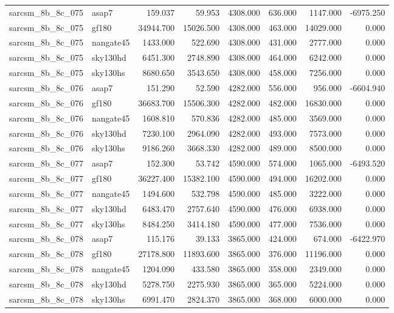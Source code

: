 \begin{tabular}{llrrrrrr}
sarcsm\_8b\_8c\_075 & asap7 & 159.037 & 59.953 & 4308.000 & 636.000 & 1147.000 & -6975.250 \\
sarcsm\_8b\_8c\_075 & gf180 & 34944.700 & 15026.500 & 4308.000 & 463.000 & 14029.000 & 0.000 \\
sarcsm\_8b\_8c\_075 & nangate45 & 1433.000 & 522.690 & 4308.000 & 431.000 & 2777.000 & 0.000 \\
sarcsm\_8b\_8c\_075 & sky130hd & 6451.300 & 2748.890 & 4308.000 & 464.000 & 6242.000 & 0.000 \\
sarcsm\_8b\_8c\_075 & sky130hs & 8680.650 & 3543.650 & 4308.000 & 458.000 & 7256.000 & 0.000 \\
sarcsm\_8b\_8c\_076 & asap7 & 151.290 & 52.590 & 4282.000 & 556.000 & 956.000 & -6604.940 \\
sarcsm\_8b\_8c\_076 & gf180 & 36683.700 & 15506.300 & 4282.000 & 482.000 & 16830.000 & 0.000 \\
sarcsm\_8b\_8c\_076 & nangate45 & 1608.810 & 570.836 & 4282.000 & 485.000 & 3569.000 & 0.000 \\
sarcsm\_8b\_8c\_076 & sky130hd & 7230.100 & 2964.090 & 4282.000 & 493.000 & 7573.000 & 0.000 \\
sarcsm\_8b\_8c\_076 & sky130hs & 9186.260 & 3668.330 & 4282.000 & 489.000 & 8500.000 & 0.000 \\
sarcsm\_8b\_8c\_077 & asap7 & 152.300 & 53.742 & 4590.000 & 574.000 & 1065.000 & -6493.520 \\
sarcsm\_8b\_8c\_077 & gf180 & 36227.400 & 15382.100 & 4590.000 & 494.000 & 16202.000 & 0.000 \\
sarcsm\_8b\_8c\_077 & nangate45 & 1494.600 & 532.798 & 4590.000 & 485.000 & 3222.000 & 0.000 \\
sarcsm\_8b\_8c\_077 & sky130hd & 6483.470 & 2757.640 & 4590.000 & 476.000 & 6938.000 & 0.000 \\
sarcsm\_8b\_8c\_077 & sky130hs & 8484.250 & 3414.180 & 4590.000 & 477.000 & 7536.000 & 0.000 \\
sarcsm\_8b\_8c\_078 & asap7 & 115.176 & 39.133 & 3865.000 & 424.000 & 674.000 & -6422.970 \\
sarcsm\_8b\_8c\_078 & gf180 & 27178.800 & 11893.600 & 3865.000 & 376.000 & 11196.000 & 0.000 \\
sarcsm\_8b\_8c\_078 & nangate45 & 1204.090 & 433.580 & 3865.000 & 358.000 & 2349.000 & 0.000 \\
sarcsm\_8b\_8c\_078 & sky130hd & 5278.750 & 2275.930 & 3865.000 & 365.000 & 5224.000 & 0.000 \\
sarcsm\_8b\_8c\_078 & sky130hs & 6991.470 & 2824.370 & 3865.000 & 368.000 & 6000.000 & 0.000 \\

\end{tabular}
